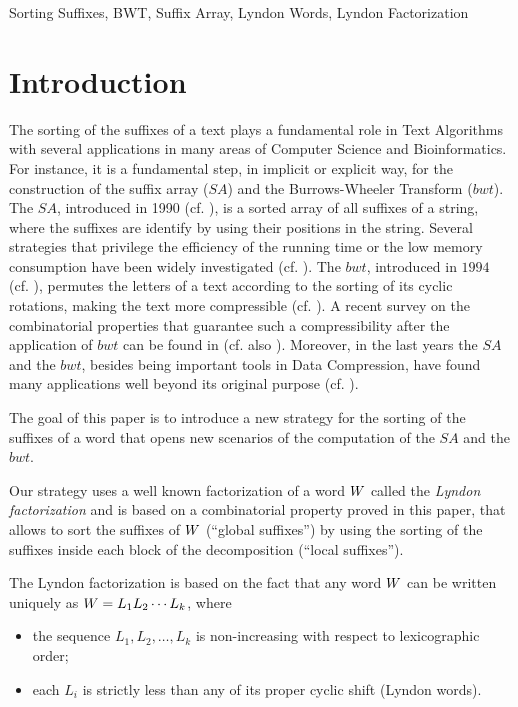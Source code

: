 \documentclass[envcountsame,runningheads]{llncs}
\begin{document}
\begin{keywords}
Sorting Suffixes, BWT, Suffix Array, Lyndon Words, Lyndon Factorization
\end{keywords}


\section{Introduction}


The sorting of the suffixes of a text plays a fundamental role in Text Algorithms with several applications in many areas of Computer Science and Bioinformatics.
For instance, it is a fundamental step, in implicit or explicit way, for the construction of the suffix array ($SA$) and the Burrows-Wheeler Transform ($bwt$).
The $SA$, introduced in 1990 (cf. \cite{Manber:1990}), is a sorted array of all suffixes of a string, where the suffixes are identify by using their positions in the string. Several strategies that privilege the efficiency of the running time or the low memory consumption have been widely investigated (cf. \cite{Puglisi:2007,GrossiSurvey2011}).
The $bwt$, introduced in $1994$ (cf. \cite{bwt94}), permutes the letters of a text according to the sorting of its cyclic rotations, making the text more compressible (cf. \cite{bookBWTAdjeroh:2008}). A recent survey on the combinatorial properties that guarantee such a compressibility after the application of $bwt$ can be found in \cite{RosoneSciortino_CiE2013} (cf. also \cite{RestivoRosoneTCS2011}).
Moreover, in the last years the $SA$ and the $bwt$, besides being important tools in Data Compression, have found many applications well beyond its original purpose (cf. \cite{AbouelhodaKurtzOhlebusch2002,Ferragina:2000,FerraginaManzini2001,MantaciRRS08,Simpson2010,CoxJakobiRosoneST2012,bookBWTAdjeroh:2008}).

The goal of this paper is to introduce a new strategy for the sorting of the suffixes of a word that opens new scenarios of the computation of the $SA$ and the $bwt$.

Our strategy uses a well known factorization of a word $W$ called the \emph{Lyndon factorization} and is based on a combinatorial property proved in this paper, that allows to sort the suffixes of $W$ (``global suffixes'') by using the sorting of the suffixes inside each block of the decomposition (``local suffixes'').


The Lyndon factorization is based on the fact that any word $W$ can be written uniquely as $W=L_1L_2 \cdots L_k$, where
\begin{itemize}
  \item the sequence $L_1,L_2, \ldots, L_k$ is non-increasing with respect to lexicographic order;
  \item each $L_i$ is strictly less than any of its proper cyclic shift (Lyndon words).
\end{itemize}
\end{document}
